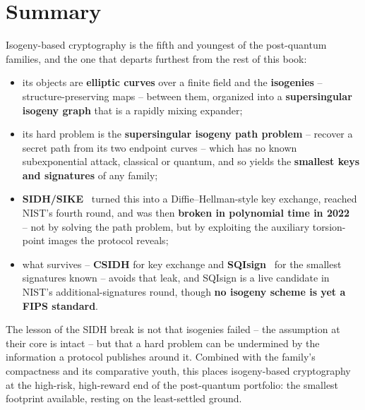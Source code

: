 \section{Summary}

Isogeny-based cryptography is the fifth and youngest of the post-quantum families, and the one that departs furthest from the rest of this book:

\begin{itemize}
  \item its objects are \textbf{elliptic curves} over a finite field and the \textbf{isogenies} -- structure-preserving maps -- between them, organized into a \textbf{supersingular isogeny graph} that is a rapidly mixing expander;
  \item its hard problem is the \textbf{supersingular isogeny path problem} -- recover a secret path from its two endpoint curves -- which has no known subexponential attack, classical or quantum, and so yields the \textbf{smallest keys and signatures} of any family;
  \item \textbf{SIDH/SIKE}~\cite{jaodefeo2011} turned this into a Diffie--Hellman-style key exchange, reached NIST's fourth round, and was then \textbf{broken in polynomial time in 2022}~\cite{castryckdecru2023} -- not by solving the path problem, but by exploiting the auxiliary torsion-point images the protocol reveals;
  \item what survives -- \textbf{CSIDH} for key exchange and \textbf{SQIsign}~\cite{sqisign2020} for the smallest signatures known -- avoids that leak, and SQIsign is a live candidate in NIST's additional-signatures round, though \textbf{no isogeny scheme is yet a FIPS standard}.
\end{itemize}

The lesson of the SIDH break is not that isogenies failed -- the assumption at their core is intact -- but that a hard problem can be undermined by the information a protocol publishes around it. Combined with the family's compactness and its comparative youth, this places isogeny-based cryptography at the high-risk, high-reward end of the post-quantum portfolio: the smallest footprint available, resting on the least-settled ground.

\printbibliography[heading=chapterrefs]

